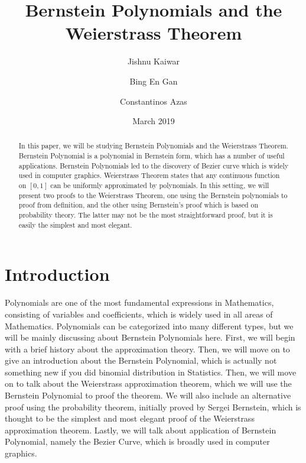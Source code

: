 \documentclass{article}
\title{Bernstein Polynomials and the Weierstrass Theorem}
\author{Jishnu Kaiwar
  \and
  Bing En Gan
  \and
  Constantinos Azas}
\date{March 2019}
\begin{document}
\maketitle

\begin{abstract}
    In this paper, we will be studying Bernstein Polynomials and the Weierstrass Theorem.
    Bernstein Polynomial is a polynomial in Bernstein form, which has a number of useful applications.
    Bernstein Polynomials led to the discovery of Bezier curve which is widely used in computer graphics.
    Weierstrass Theorem states that any continuous function on $[0,1]$ can be uniformly approximated by polynomials.
    In this setting, we will present two proofs to the Weierstrass Theorem, one using the Bernstein polynomials to proof from definition, and the other using Bernstein's proof which is based on probability theory.
    The latter may not be the most straightforward proof, but it is easily the simplest and most elegant.
\end{abstract}
\newpage
\tableofcontents 
\newpage
\section{Introduction}\label{sec:intro}
Polynomials are one of the most fundamental expressions in Mathematics, consisting of variables and coefficients, which is widely used in all areas of Mathematics. Polynomials can be categorized into many different types, but we will be mainly discussing about Bernstein Polynomials here. First, we will begin with a brief history about the approximation theory. Then, we will move on to give an introduction about the Bernstein Polynomial, which is actually not something new if you did binomial distribution in Statistics. Then, we will move on to talk about the Weierstrass approximation theorem, which we will use the Bernstein Polynomial to proof the theorem. We will also include an alternative proof using the probability theorem, initially proved by Sergei Bernstein, which is thought to be the simplest and most elegant proof of the Weierstrass approximation theorem. Lastly, we will talk about application of Bernstein Polynomial, namely the Bezier Curve, which is broadly used in computer graphics.
\end{document}
